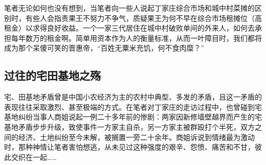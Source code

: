   笔者无论如何也没有想到，当笔者向一些人说起丁家庄综合市场和城中村菜摊的区别时，有些人会指责果王不努力不争气，质疑果王为何不早在综合市场租摊位（高租金）以求得良好收益。一个一家三代居住在城中村破败单间的外来人，如何去承担每年数万的租金啊。简单用资本作为人的衡量标准，从而一叶障目时，我们都将成为那个呆傻可笑的晋惠帝，“百姓无粟米充饥，何不食肉糜？”

  \subsection{过往的宅田基地之殇}








  宅、田基地矛盾曾是中国小农经济为主的农村中典型、多发的矛盾，且这一矛盾的表现往往采取激烈、甚至极端的方式。在笔者对丁家庄的走访过程中，也曾碰到宅基地纠纷当事人商姐说起一例二十多年前的惨剧：两家因新修墙壁越界而产生的宅基地矛盾步步升级，致使事件一方家主自杀，另一方家主被群殴打个半死，双方之间的经济、土地纠纷至今未解，被搁置一旁二十余年。商姐诉说到情绪最为激动时，那种神情让笔者害怕想逃，从未见过这种强度的艰辛、怨愤、痛苦和不甘，彼此交织在一起……

